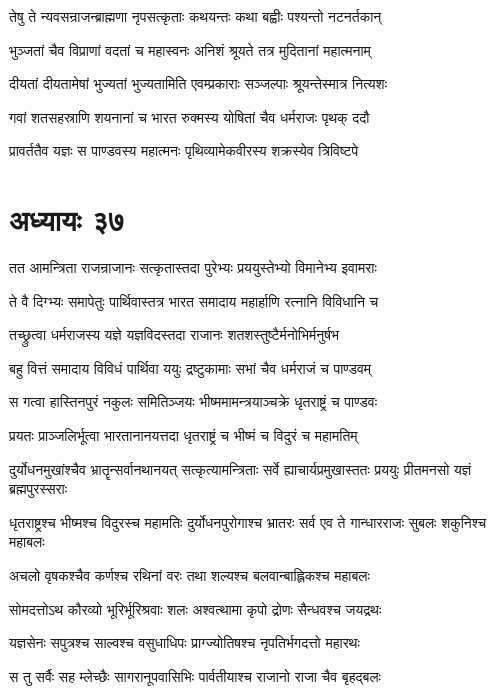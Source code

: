 \twolineshloka
{तेषु ते न्यवसन्राजन्ब्राह्मणा नृपसत्कृताः}
{कथयन्तः कथा बह्वीः पश्यन्तो नटनर्तकान्}


\twolineshloka
{भुञ्जतां चैव विप्राणां वदतां च महास्वनः}
{अनिशं श्रूयते तत्र मुदितानां महात्मनाम्}


\twolineshloka
{दीयतां दीयतामेषां भुज्यतां भुज्यतामिति}
{एवम्प्रकाराः सञ्जल्पाः श्रूयन्तेस्मात्र नित्यशः}


\twolineshloka
{गवां शतसहस्राणि शयनानां च भारत}
{रुक्मस्य योषितां चैव धर्मराजः पृथक् ददौ}


\twolineshloka
{प्रावर्ततैव यज्ञः स पाण्डवस्य महात्मनः}
{पृथिव्यामेकवीरस्य शक्रस्येव त्रिविष्टपे}


\chapter{अध्यायः ३७}
\twolineshloka
{तत आमन्त्रिता राजन्राजानः सत्कृतास्तदा}
{पुरेभ्यः प्रययुस्तेभ्यो विमानेभ्य इवामराः}


\twolineshloka
{ते वै दिग्भ्यः समापेतुः पार्थिवास्तत्र भारत}
{समादाय महार्हाणि रत्नानि विविधानि च}


\twolineshloka
{तच्छ्रुत्वा धर्मराजस्य यज्ञे यज्ञविदस्तदा}
{राजानः शतशस्तुष्टैर्मनोभिर्मनुर्षभ}


\twolineshloka
{बहु वित्तं समादाय विविधं पार्थिवा ययुः}
{द्रष्टुकामाः सभां चैव धर्मराजं च पाण्डवम्}


\twolineshloka
{स गत्वा हास्तिनपुरं नकुलः समितिञ्जयः}
{भीष्ममामन्त्रयाञ्चक्रे धृतराष्ट्रं च पाण्डवः}


\twolineshloka
{प्रयतः प्राञ्जलिर्भूत्वा भारतानानयत्तदा}
{धृतराष्ट्रं च भीष्मं च विदुरं च महामतिम्}


दुर्योधनमुखांश्चैव भ्रातॄन्सर्वानथानयत्
\twolineshloka
{सत्कृत्यामन्त्रिताः सर्वे ह्याचार्यप्रमुखास्ततः}
{प्रययुः प्रीतमनसो यज्ञं ब्रह्मपुरस्सराः}


\threelineshloka
{धृतराष्ट्रश्च भीष्मश्च विदुरस्च महामतिः}
{दुर्योधनपुरोगाश्च भ्रातरः सर्व एव ते}
{गान्धारराजः सुबलः शकुनिश्च महाबलः}


\twolineshloka
{अचलो वृषकश्चैव कर्णश्च रथिनां वरः}
{तथा शल्यश्च बलवान्बाह्लिकश्च महाबलः}


\twolineshloka
{सोमदत्तोऽथ कौरव्यो भूरिर्भूरिश्रवाः शलः}
{अश्वत्थामा कृपो द्रोणः सैन्धवश्च जयद्रथः}


\twolineshloka
{यज्ञसेनः सपुत्रश्च साल्वश्च वसुधाधिपः}
{प्राग्ज्योतिषश्च नृपतिर्भगदत्तो महारथः}


\twolineshloka
{स तु सर्वैः सह म्लेच्छैः सागरानूपवासिभिः}
{पार्वतीयाश्च राजानो राजा चैव बृहद्बलः}


